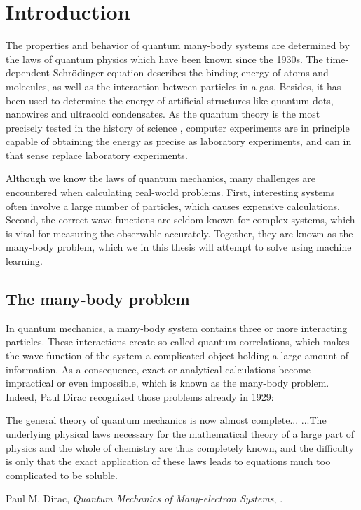\chapter{Introduction}
The properties and behavior of quantum many-body systems are determined by the laws of quantum physics which have been known since the 1930s. The time-dependent Schrödinger equation describes the binding energy of atoms and molecules, as well as the interaction between particles in a gas. Besides, it has been used to determine the energy of artificial structures like quantum dots, nanowires and ultracold condensates. As the quantum theory is the most precisely tested in the history of science \cite{odom_new_2006}, computer experiments are in principle capable of obtaining the energy as precise as laboratory experiments, and can in that sense replace laboratory experiments.

Although we know the laws of quantum mechanics, many challenges are encountered when calculating real-world problems. First, interesting systems often involve a large number of particles, which causes expensive calculations. Second, the correct wave functions are seldom known for complex systems, which is vital for measuring the observable accurately. Together, they are known as the many-body problem, which we in this thesis will attempt to solve using machine learning.

\section{The many-body problem}
In quantum mechanics, a many-body system contains three or more interacting particles. These interactions create so-called quantum correlations, which makes the wave function of the system a complicated object holding a large amount of information. As a consequence, exact or analytical calculations become impractical or even impossible, which is known as the many-body problem. Indeed, Paul Dirac recognized those problems already in 1929:

\begin{shadequote}{
		The general theory of quantum mechanics is now almost complete... ...The underlying physical laws necessary for the mathematical theory of a large part of physics and the whole of chemistry are thus completely known, and the difficulty is only that the exact application of these laws leads to equations much too complicated to be soluble. \par Paul M. Dirac, \emph{Quantum Mechanics of Many-electron Systems}, \cite{dirac_paul_adrien_maurice_quantum_1929}.}
\end{shadequote}

